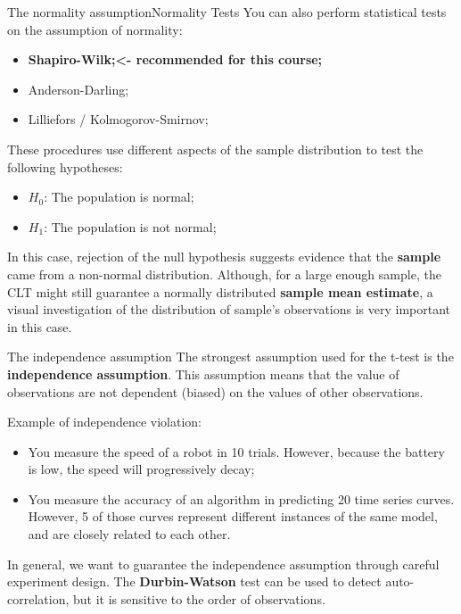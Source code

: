 \begin{frame}{The normality assumption}{Normality Tests}
  You can also perform statistical tests on the assumption of normality:
  \begin{itemize}
    \item {\bf Shapiro-Wilk;\hfill <- recommended for this course;}
    \item Anderson-Darling;
    \item Lilliefors / Kolmogorov-Smirnov;
  \end{itemize}\bigskip

  These procedures use different aspects of the sample distribution to test the following hypotheses:
  \begin{itemize}
    \item $H_0$: The population is normal;
    \item $H_1$: The population is not normal;
  \end{itemize}\bigskip

  In this case, rejection of the null hypothesis suggests evidence that the {\bf sample} came from a non-normal distribution. Although, for a large enough sample, the CLT might still guarantee a normally distributed {\bf sample mean estimate}, a visual investigation of the distribution of sample's observations is very important in this case.
\end{frame}

\begin{frame}{The independence assumption}
  The strongest assumption used for the t-test is the {\bf independence assumption}. This assumption means that the value of observations are not dependent (biased) on the values of other observations.\bigskip

  Example of independence violation:
  \begin{itemize}
    \item You measure the speed of a robot in 10 trials. However, because the battery is low, the speed will progressively decay;
    \item You measure the accuracy of an algorithm in predicting 20 time series curves. However, 5 of those curves represent different instances of the same model, and are closely related to each other.
  \end{itemize}\bigskip

  In general, we want to guarantee the independence assumption through careful experiment design. The {\bf Durbin-Watson} test can be used to detect auto-correlation, but it is sensitive to the order of observations.
\end{frame}


